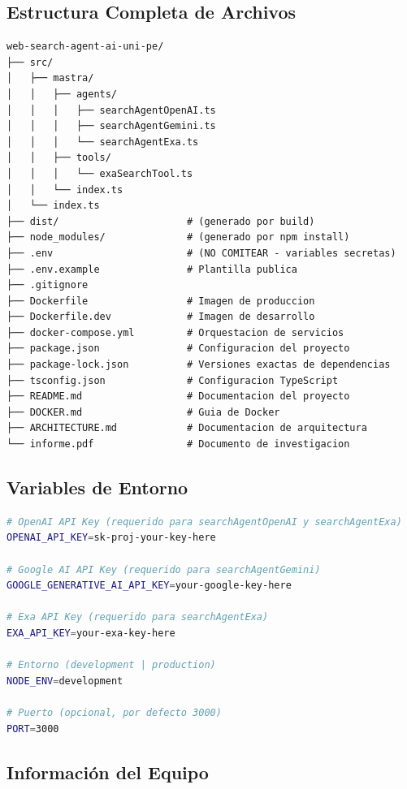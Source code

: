 \documentclass[12pt,a4paper]{article}
\begin{document}
\subsection{Estructura Completa de Archivos}

\begin{lstlisting}[caption=Árbol de Directorios del Proyecto]
web-search-agent-ai-uni-pe/
├── src/
│   ├── mastra/
│   │   ├── agents/
│   │   │   ├── searchAgentOpenAI.ts
│   │   │   ├── searchAgentGemini.ts
│   │   │   └── searchAgentExa.ts
│   │   ├── tools/
│   │   │   └── exaSearchTool.ts
│   │   └── index.ts
│   └── index.ts
├── dist/                      # (generado por build)
├── node_modules/              # (generado por npm install)
├── .env                       # (NO COMITEAR - variables secretas)
├── .env.example               # Plantilla publica
├── .gitignore
├── Dockerfile                 # Imagen de produccion
├── Dockerfile.dev             # Imagen de desarrollo
├── docker-compose.yml         # Orquestacion de servicios
├── package.json               # Configuracion del proyecto
├── package-lock.json          # Versiones exactas de dependencias
├── tsconfig.json              # Configuracion TypeScript
├── README.md                  # Documentacion del proyecto
├── DOCKER.md                  # Guia de Docker
├── ARCHITECTURE.md            # Documentacion de arquitectura
└── informe.pdf                # Documento de investigacion
\end{lstlisting}

\subsection{Variables de Entorno}

\begin{lstlisting}[language=bash, caption=.env.example - Plantilla de Configuración]
# OpenAI API Key (requerido para searchAgentOpenAI y searchAgentExa)
OPENAI_API_KEY=sk-proj-your-key-here

# Google AI API Key (requerido para searchAgentGemini)
GOOGLE_GENERATIVE_AI_API_KEY=your-google-key-here

# Exa API Key (requerido para searchAgentExa)
EXA_API_KEY=your-exa-key-here

# Entorno (development | production)
NODE_ENV=development

# Puerto (opcional, por defecto 3000)
PORT=3000
\end{lstlisting}

\subsection{Información del Equipo}
\end{document}
